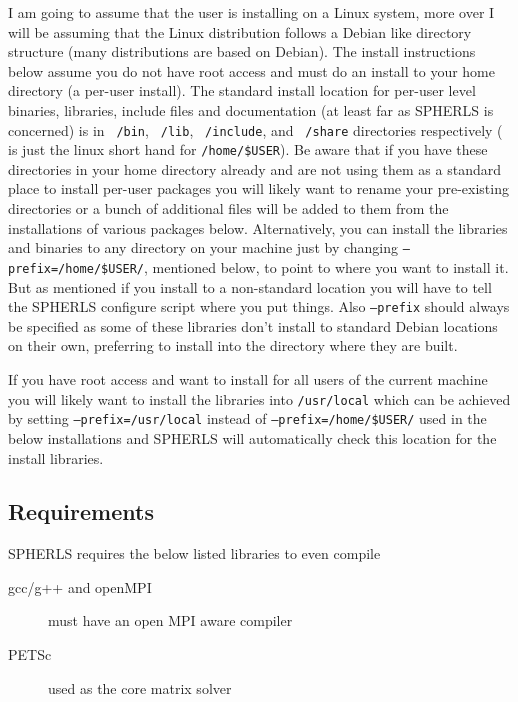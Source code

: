 \documentclass[12pt,a4paper]{book}
\begin{document}
I am going to assume that the user is installing on a Linux system, more over I will be assuming that the Linux distribution follows a Debian like directory structure (many distributions are based on Debian). The install instructions below assume you do not have root access and must do an install to your home directory (a per-user install). The standard install location for per-user level binaries, libraries, include files and documentation (at least far as SPHERLS is concerned) is in {\tt ~/bin}, {\tt ~/lib}, {\tt ~/include}, and {\tt ~/share} directories respectively ({\tt ~} is just the linux short hand for {\tt /home/\-\$USER}). Be aware that if you have these directories in your home directory already and are not using them as a standard place to install per-user packages you will likely want to rename your pre-existing directories or a bunch of additional files will be added to them from the installations of various packages below. Alternatively, you can install the libraries and binaries to any directory on your machine just by changing {\tt --prefix\-=/home/\-\$USER/}, mentioned below, to point to where you want to install it. But as mentioned if you install to a non-standard location you will have to tell the SPHERLS configure script where you put things. Also {\tt --prefix} should always be specified as some of these libraries don't install to standard Debian locations on their own, preferring to install into the directory where they are built.

If you have root access and want to install for all users of the current machine you will likely want to install the libraries into {\tt /usr/\-local}  which can be achieved by setting {\tt --prefix=/usr/local} instead of {\tt --prefix\-=/home/\-\$USER/} used in the below installations and SPHERLS will automatically check this location for the install libraries.
    
\subsection{Requirements}
SPHERLS requires the below listed libraries to even compile
\begin{description}
\item[gcc/g++ and openMPI] must have an open MPI aware compiler
\item[PETSc] used as the core matrix solver
\end{description}
\end{document}
